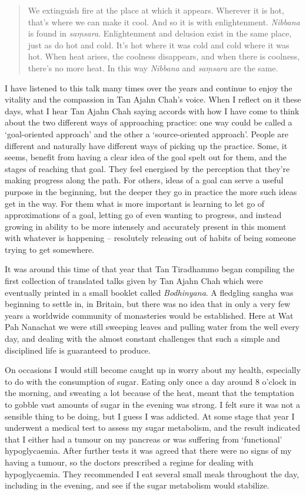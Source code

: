 \begin{quotation}
We extinguish fire at the place at which it appears. Wherever it is hot,
that's where we can make it cool. And so it is with enlightenment.
\emph{Nibbana} is found in \emph{saṃsara}. Enlightenment and delusion
exist in the same place, just as do hot and cold. It's hot where it was
cold and cold where it was hot. When heat arises, the coolness
disappears, and when there is coolness, there's no more heat. In this
way \emph{Nibbana} and \emph{saṃsara} are the same.
\end{quotation}

I have listened to this talk many times over the years and continue to
enjoy the vitality and the compassion in Tan Ajahn Chah's voice. When I
reflect on it these days, what I hear Tan Ajahn Chah saying accords with
how I have come to think about the two different ways of approaching
practice: one way could be called a `goal-oriented approach' and the
other a `source-oriented approach'. People are different and naturally
have different ways of picking up the practice. Some, it seems, benefit
from having a clear idea of the goal spelt out for them, and the stages
of reaching that goal. They feel energised by the perception that
they're making progress along the path. For others, ideas of a goal can
serve a useful purpose in the beginning, but the deeper they go in
practice the more such ideas get in the way. For them what is more
important is learning to let go of approximations of a goal, letting go of
even wanting to progress, and instead growing in ability to be more
intensely and accurately present in this moment with whatever is happening -- resolutely releasing out of habits of being someone trying to get somewhere.

It was around this time of that year that Tan Tiradhammo began compiling
the first collection of translated talks given by Tan Ajahn Chah which
were eventually printed in a small booklet called \emph{Bodhinyana}. A
fledgling sangha was beginning to settle in, in Britain, but there was
no idea that in only a very few years a worldwide community of
monasteries\cite{forestsangha} would be established. Here
at Wat Pah Nanachat we were still sweeping leaves and pulling water from
the well every day, and dealing with the almost constant challenges that
such a simple and disciplined life is guaranteed to produce.

On occasions I would still become caught up in worry about my health,
especially to do with the consumption of sugar. Eating only once a day
around 8 o'clock in the morning, and sweating a lot because of the heat,
meant that the temptation to gobble vast amounts of sugar in the evening
was strong. I felt sure it was not a sensible thing to be doing, but I
guess I was addicted. At some stage that year I underwent a medical test
to assess my sugar metabolism, and the result indicated that I either
had a tumour on my pancreas or was suffering from `functional'
hypoglycaemia. After further tests it was agreed that there were no
signs of my having a tumour, so the doctors prescribed a regime for
dealing with hypoglycaemia. They recommended I eat several small meals
throughout the day, including in the evening, and see if the sugar
metabolism would stabilize.

